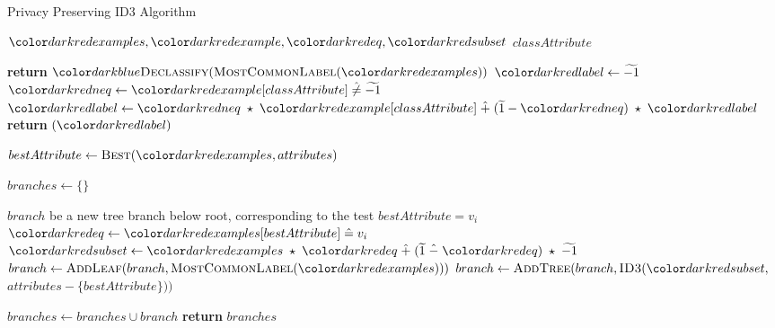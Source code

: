 \begin{algorithm}[H]
\caption{Privacy Preserving ID3 Algorithm}\label{a:id3-pp}
\begin{algorithmic}[1]
\renewcommand{\algorithmicrequire}{\textbf{Private Vars:}}
\Require $\red{examples}, \red{example}, \red{eq}, \red{subset}$
\renewcommand{\algorithmicrequire}{\textbf{Global Vars:}}
\Require $classAttribute$

         \State \textbf{return} ${\blue{\textsc{Declassify}}}(\textsc{MostCommonLabel}(\red{examples}))$
       \State $\red{label} \gets \enc{-1}$
           \State $\red{neq} \gets \red{example}[classAttribute] \hneq \enc{-1}$
           \State $\red{label} \gets \red{neq} \hmul \red{example}[classAttribute] \hplus (\enc{1} - \red{neq}) \hmul \red{label} $
       \EndFor
       \State \textbf{return} {{}}$(\red{label})$
    \EndIf

    \State $bestAttribute \gets \textsc{Best}(\red{examples}, attributes)$


    \State $branches \gets \{\}$

         $branch$ {\small be a new tree branch below root, corresponding to the test} $bestAttribute = v_i$
      \State $\red{eq} \gets \red{examples}[bestAttribute] \heq v_i$ 
      \State $\red{subset} \gets \red{examples} \hmul \red{eq} \hplus (\enc{1} \hminus \red{eq}) \hmul \enc{-1} $ 
            \State $branch \gets \textsc{AddLeaf}(branch, \textsc{MostCommonLabel}(\red{examples})))$ 
        \Else
            \State $branch \gets \textsc{AddTree}(branch, \textsc{ID3}(\red{subset},$ $attributes - \{bestAttribute\}))$ \par\hfill {}
        \EndIf
        \State $branches \gets branches \cup branch$
    \EndFor
    \State \textbf{return} $branches$

\EndProcedure

\end{algorithmic}
\end{algorithm}

